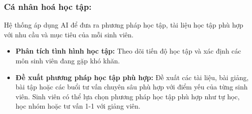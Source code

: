 \subsubsection{Cá nhân hoá học tập:}
Hệ thống áp dụng AI để đưa ra phương pháp học tập, tài liệu học tập phù hợp với nhu cầu và mục tiêu của mỗi sinh viên.
\begin{itemize}
    \item \textbf{Phân tích tình hình học tập:}
    Theo dõi tiến độ học tập và xác định các môn sinh viên đang gặp khó khăn.

    \item \textbf{Đề xuất phương pháp học tập phù hợp:}
    Đề xuất các tài liệu, bài giảng, bài tập hoặc các buổi tư vấn chuyên sâu phù hợp với điểm yếu của từng sinh viên. Sinh viên có thể lựa chọn phương pháp học tập phù hợp như tự học, học nhóm hoặc tư vấn 1-1 với giảng viên.
\end{itemize}
